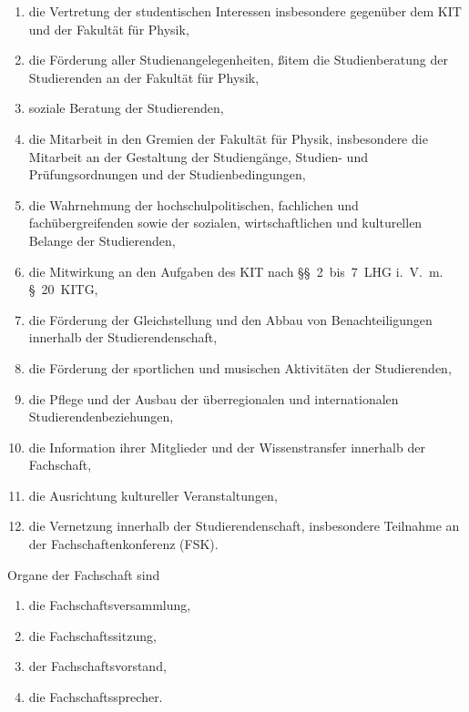 \documentclass[a4paper,parskip=half,numbers=noenddot]{scrartcl}
\begin{document}
\begin{contract}
\begin{enumerate}
\item die Vertretung der studentischen Interessen insbesondere gegenüber dem KIT und der Fakultät für Physik,
\item die Förderung aller Studienangelegenheiten,
 ßitem die Studienberatung der Studierenden an der Fakultät für Physik,
\item soziale Beratung der Studierenden,
\item die Mitarbeit in den Gremien der Fakultät für Physik, insbesondere die Mitarbeit an der Gestaltung der Studiengänge, Studien- und Prüfungsordnungen und der Studienbedingungen,
\item die Wahrnehmung der hochschulpolitischen, fachlichen und fachübergreifenden sowie der sozialen, wirtschaftlichen und kulturellen Belange der Studierenden,
\item die Mitwirkung an den Aufgaben des KIT nach §§~2~bis~7~LHG i.~V.~m. §~20~KITG,
\item die Förderung der Gleichstellung und den Abbau von Benachteiligungen innerhalb der Studierendenschaft,
\item die Förderung der sportlichen und musischen Aktivitäten der Studierenden,
\item die Pflege und der Ausbau der überregionalen und internationalen Studierendenbeziehungen,
\item die Information ihrer Mitglieder und der Wissenstransfer innerhalb der Fachschaft,
\item die Ausrichtung kultureller Veranstaltungen,
\item die Vernetzung innerhalb der Studierendenschaft, insbesondere Teilnahme an der Fachschaftenkonferenz (FSK).

\end{enumerate}


%
%



Organe der Fachschaft sind

  \begin{enumerate}
  \item die Fachschaftsversammlung,
  \item die Fachschaftssitzung,
  \item der Fachschaftsvorstand,
  \item die Fachschaftssprecher.
  \end{enumerate}
\label{fachschaft:vv}


\end{contract}
\end{document}
